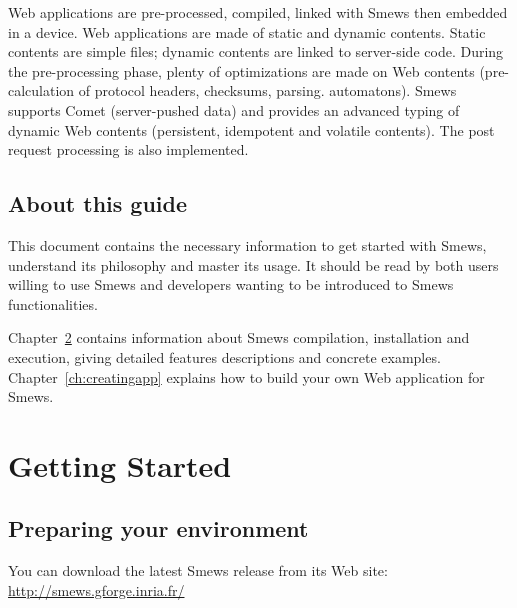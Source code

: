 \documentclass{report}
\newcommand{\rchap}[1]{Chapter~\ref{ch:#1}}
\begin{document}
Web applications are pre-processed, compiled, linked with Smews then embedded in a device. Web applications are made of static and dynamic contents. Static contents are simple files; dynamic contents are linked to server-side code. During the pre-processing phase, plenty of optimizations are made on Web contents (pre-calculation of protocol headers, checksums, parsing. automatons). Smews supports Comet (server-pushed data) and provides an advanced typing of dynamic Web contents (persistent, idempotent and volatile contents). The post request processing is also implemented.

\section{About this guide}

This document contains the necessary information to get started with Smews, understand its philosophy and master its usage. It should be read by both users willing to use Smews and developers wanting to be introduced to Smews functionalities.

\rchap{gettingstarted} contains information about Smews compilation, installation and execution, giving detailed features descriptions and concrete examples. \rchap{creatingapp} explains how to build your own Web application for Smews.

\chapter{Getting Started}
\label{ch:gettingstarted}

\section{Preparing your environment}

You can download the latest Smews release from its Web site: \url{http://smews.gforge.inria.fr/}
\end{document}
